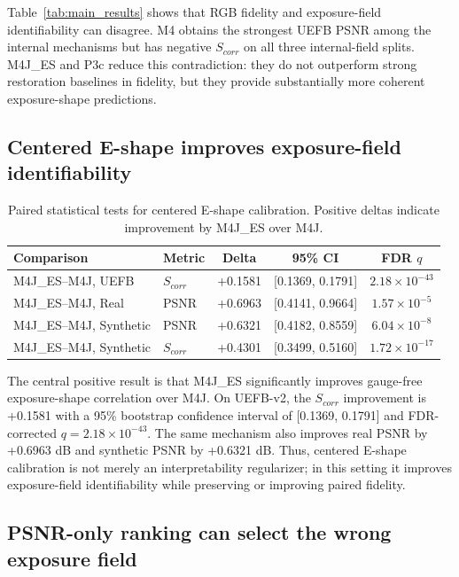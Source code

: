 Table~\ref{tab:main_results} shows that RGB fidelity and exposure-field identifiability can disagree. M4 obtains the strongest UEFB PSNR among the internal mechanisms but has negative $S_{corr}$ on all three internal-field splits. M4J\_ES and P3c reduce this contradiction: they do not outperform strong restoration baselines in fidelity, but they provide substantially more coherent exposure-shape predictions.

\subsection{Centered E-shape improves exposure-field identifiability}

\begin{table}[t]
\centering
\small
\begin{tabular}{llccc}
\hline
Comparison & Metric & Delta & 95\% CI & FDR $q$ \\
\hline
M4J\_ES--M4J, UEFB & $S_{corr}$ & +0.1581 & [0.1369, 0.1791] & $2.18\times10^{-43}$ \\
M4J\_ES--M4J, Real & PSNR & +0.6963 & [0.4141, 0.9664] & $1.57\times10^{-5}$ \\
M4J\_ES--M4J, Synthetic & PSNR & +0.6321 & [0.4182, 0.8559] & $6.04\times10^{-8}$ \\
M4J\_ES--M4J, Synthetic & $S_{corr}$ & +0.4301 & [0.3499, 0.5160] & $1.72\times10^{-17}$ \\
\hline
\end{tabular}
\caption{Paired statistical tests for centered E-shape calibration. Positive deltas indicate improvement by M4J\_ES over M4J.}
\label{tab:eshape_stats}
\end{table}

The central positive result is that M4J\_ES significantly improves gauge-free exposure-shape correlation over M4J. On UEFB-v2, the $S_{corr}$ improvement is +0.1581 with a 95\% bootstrap confidence interval of [0.1369, 0.1791] and FDR-corrected $q=2.18\times10^{-43}$. The same mechanism also improves real PSNR by +0.6963 dB and synthetic PSNR by +0.6321 dB. Thus, centered E-shape calibration is not merely an interpretability regularizer; in this setting it improves exposure-field identifiability while preserving or improving paired fidelity.

\subsection{PSNR-only ranking can select the wrong exposure field}

